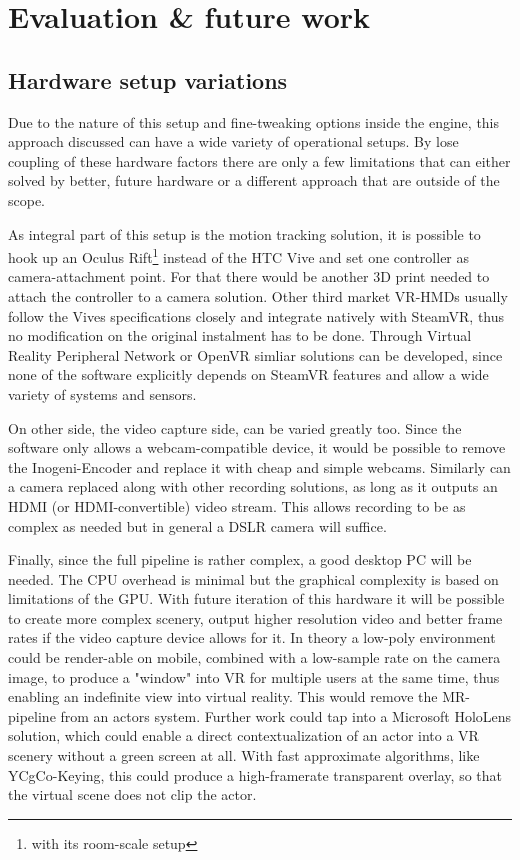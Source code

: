 %
\chapter{Evaluation \& future work}

\section{Hardware setup variations}

Due to the nature of this setup and fine-tweaking options inside the engine, 
this approach discussed can have a wide variety of operational setups. By lose 
coupling of these hardware factors there are only a few limitations that can 
either solved by better, future hardware or a different approach that are 
outside of the scope.

As integral part of this setup is the motion tracking solution, it is possible 
to hook up an Oculus Rift\footnote{with its room-scale setup} instead of the 
HTC Vive and set one controller as camera-attachment point. For that there 
would be another 3D print needed to attach the controller to a camera solution. 
\newline
Other third market VR-HMDs usually follow the Vives specifications closely and 
integrate natively with SteamVR, thus no modification on the original 
instalment has to be done.
\newline
Through Virtual Reality Peripheral Network or OpenVR simliar solutions can be 
developed, since none of the software explicitly depends on SteamVR features 
and allow a wide variety of systems and sensors.

On other side, the video capture side, can be varied greatly too. Since the 
software only allows a webcam-compatible device, it would be possible to remove 
the Inogeni-Encoder and replace it with cheap and simple webcams. Similarly can 
a camera replaced along with other recording solutions, as long as it outputs 
an HDMI (or HDMI-convertible) video stream. This allows recording to be as 
complex as needed but in general a DSLR camera will suffice.

Finally, since the full pipeline is rather complex, a good desktop PC will be 
needed. The CPU overhead is minimal but the graphical complexity is based on 
limitations of the GPU. With future iteration of this hardware it will be 
possible to create more complex scenery, output higher resolution video and 
better frame rates if the video capture device allows for it.
\newline
In theory a low-poly environment could be render-able on mobile, combined with 
a low-sample rate on the camera image, to produce a "window" into VR for 
multiple users at the same time, thus enabling an indefinite view into virtual 
reality. This would remove the MR-pipeline from an actors system. Further work 
could tap into a Microsoft HoloLens solution, which could enable a direct 
contextualization of an actor into a VR scenery without a green screen at all. 
With fast approximate algorithms, like YCgCo-Keying, this could produce a 
high-framerate transparent overlay, so that the virtual scene does not clip the 
actor.

